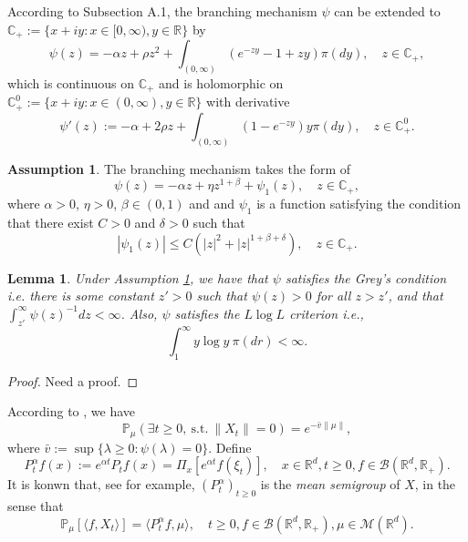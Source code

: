 \documentclass[12pt,a4paper]{amsart}
\theoremstyle{plain}
\newtheorem{lem}[thm]{Lemma}
\theoremstyle{definition}
\newtheorem{asp}{Assumption}
\numberwithin{equation}{section}
\begin{document}
   According to  Subsection A.1, the branching mechanism $\psi$ can be extended to
    $\mathbb C_+:=\{x+iy: x\in [0, \infty), y\in \mathbb R\}$ by
 \[\psi(z)=
    - \alpha z + \rho z^2 + \int_{(0,\infty)} (e^{-zy} - 1 + zy) \pi(dy),
    \quad  z \in \mathbb C_+,\]
    which is continuous on $\mathbb C_+$ and is holomorphic on $\mathbb C_+^0:=
    \{x+iy: x\in (0, \infty), y\in \mathbb R\}$ with derivative
\begin{equation}
\label{eq: deriavetive of the Poission part}
    \psi'(z) := -\alpha + 2\rho z+ \int_{(0,\infty)} (1-e^{-zy}) y\pi(dy),
    \quad z\in \mathbb C^0_+.
\end{equation}
{ \bf
\begin{asp}
\label{asp: branching mechanism}
    The branching mechanism takes the form of
\[
    \psi(z) = -\alpha z + \eta z^{1+\beta} + \psi_1(z),\quad z\in \mathbb C_+,
\]
   where $\alpha>0$, $\eta > 0$, $\beta \in (0,1)$ and 
    and $\psi_1$ is a function satisfying the condition that there exist $C >0$ and $\delta >0$ such that
\[
    |\psi_1(z)| \leq C(|z|^2+|z|^{1+\beta + \delta}),\quad z\in \mathbb C_+.
\]
\end{asp}
\begin{lem}
    Under Assumption \ref{asp: branching mechanism}, we have that $\psi$ satisfies the Grey's condition i.e. there is some constant $z' > 0$ such that $\psi(z) > 0$ for all $z>z'$, and that $\int_{z'}^\infty \psi(z)^{-1}dz < \infty$.
    Also, $\psi$ satisfies the $L \log L$ criterion  i.e.,
\[
    \int_1^\infty y \log y~\pi(dr)< \infty.
\]
\end{lem}
\begin{proof}
    { Need a proof.}
\end{proof}
}
    According to \cite[Theorems 12.5 \& 12.7]{Kyprianou2014Fluctuations}, we have
\begin{equation}
    \mathbb{P}_{\mu} (\exists t\geq 0,~\text{s.t.}~\|X_t\|=0)
    = e^{-\bar v \|\mu\|},
\end{equation}
    where $\bar v := \sup\{\lambda \geq 0: \psi(\lambda) = 0\}$.
    Define
\begin{equation}\label{meansemigroup}
    P^{\alpha}_t f(x)
    :=
    e^{\alpha t} P_t f(x) =
    \Pi_x [e^{\alpha t}f(\xi_t)],
    \quad x\in \mathbb R^d,t\geq 0, f\in \mathcal B(\mathbb R^d, \mathbb R_+).
\end{equation}
    It is konwn that, see \cite[Proposition 2.27]{Li2011Measure-valued} for example, $(P^\alpha_t)_{t\geq 0}$ is the \emph{mean semigroup} of $X$, in the sense that
\begin{equation}\label{eq:meanformula}
    \mathbb{P}_{\mu}[\langle f, X_t \rangle]
    = \langle P^\alpha_t f, \mu \rangle,
    \quad t\geq 0, f\in \mathcal B(\mathbb R^d, \mathbb R_+), \mu \in \mathcal M(\mathbb R^d).
\end{equation}
\end{document}
